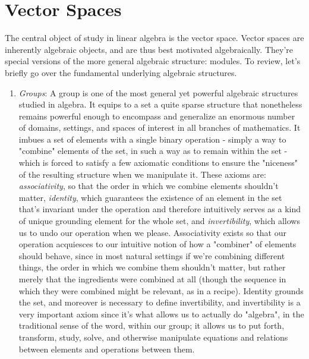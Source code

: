 \documentclass{article}
\begin{document}
\section{Vector Spaces}

The central object of study in linear algebra is the vector space. Vector spaces are inherently algebraic objects, and are thus best motivated algebraically. They're special versions of the more general algebraic structure: modules. To review, let's briefly go over the fundamental underlying algebraic structures.

\begin{enumerate}

    \item \textit{Groups}: A group is one of the most general yet powerful algebraic structures studied in algebra. It equips to a set a quite sparse structure that nonetheless remains powerful enough to encompass and generalize an enormous number of domains, settings, and spaces of interest in all branches of mathematics. It imbues a set of elements with a single binary operation - simply a way to "combine" elements of the set, in such a way as to remain within the set - which is forced to satisfy a few axiomatic conditions to ensure the "niceness" of the resulting structure when we manipulate it. These axioms are: \textit{associativity}, so that the order in which we combine elements shouldn't matter, \textit{identity}, which guarantees the existence of an element in the set that's invariant under the operation and therefore intuitively serves as a kind of unique grounding element for the whole set, and \textit{invertibility}, which allows us to undo our operation when we please. Associativity exists so that our operation acquiesces to our intuitive notion of how a "combiner" of elements should behave, since in most natural settings if we're combining different things, the order in which we combine them shouldn't matter, but rather merely that the ingredients were combined at all (though the sequence in which they were combined might be relevant, as in a recipe). Identity grounds the set, and moreover is necessary to define invertibility, and invertibility is a very important axiom since it's what allows us to actually do "algebra", in the traditional sense of the word, within our group; it allows us to put forth, transform, study, solve, and otherwise manipulate equations and relations between elements and operations between them.

\end{enumerate}
\end{document}
